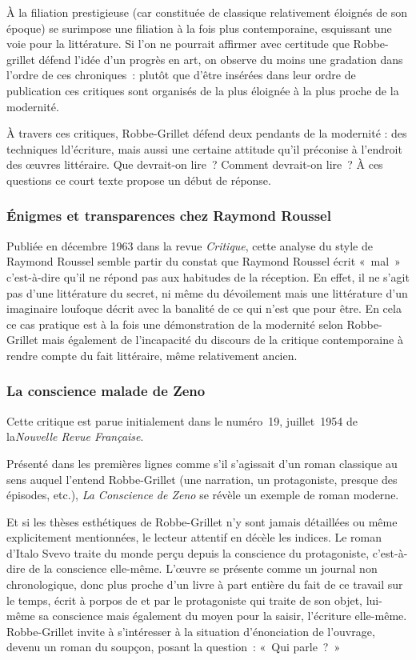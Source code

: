 \documentclass[12pt, a4paper]{article}
\begin{document}
À la filiation prestigieuse (car constituée de classique relativement éloignés de son époque) se surimpose une filiation à la fois plus contemporaine, esquissant une voie pour la littérature. Si l'on ne pourrait affirmer avec certitude que Robbe-grillet défend l'idée d'un progrès en art, on observe du moins une gradation dans l'ordre de ces chroniques~: plutôt que d'être insérées dans leur ordre de publication ces critiques sont organisés de la plus éloignée à la plus proche de la modernité.

À travers ces critiques, Robbe-Grillet défend deux pendants de la modernité : des techniques ld'écriture, mais aussi une certaine attitude qu'il préconise à l'endroit des œuvres littéraire. Que devrait-on lire~? Comment devrait-on lire~? À ces questions ce court texte propose un début de réponse.


\subsubsection{Énigmes et transparences chez Raymond Roussel}
			Publiée en décembre 1963 dans la revue \textit{Critique}, cette analyse du style de Raymond Roussel semble partir du constat que Raymond Roussel écrit «~mal~» c'est-à-dire qu'il ne répond pas aux habitudes de la réception. En effet, il ne s'agit pas d'une littérature du secret, ni même du dévoilement mais une littérature d'un imaginaire loufoque décrit avec la banalité de ce qui n'est que pour être. En cela ce cas pratique est à la fois une démonstration de la modernité selon Robbe-Grillet mais également de l'incapacité du discours de la critique contemporaine à rendre compte du fait littéraire, même relativement ancien.

\subsubsection{La conscience malade de Zeno}
			Cette critique est parue initialement dans le numéro~19, juillet~1954 de la\textit{Nouvelle Revue Française}.

Présenté dans les premières lignes comme s'il s'agissait d'un roman classique au sens auquel l'entend Robbe-Grillet (une narration, un protagoniste, presque des épisodes, etc.), \textit{La Conscience de Zeno} se révèle un exemple de roman moderne.

Et si les thèses esthétiques de Robbe-Grillet n'y sont jamais détaillées ou même explicitement mentionnées, le lecteur attentif en décèle les indices. Le roman d'Italo Svevo traite du monde perçu depuis la conscience du protagoniste, c'est-à-dire de la conscience elle-même. L'œuvre se présente comme un journal non chronologique, donc plus proche d'un livre à part entière du fait de ce travail sur le temps, écrit à porpos de et par le protagoniste qui traite de son objet, lui-même sa conscience mais également du moyen pour la saisir, l'écriture elle-même. Robbe-Grillet invite à s'intéresser à la situation d'énonciation de l'ouvrage, devenu un roman du soupçon, posant la question~: «~Qui parle~?~»
\end{document}
